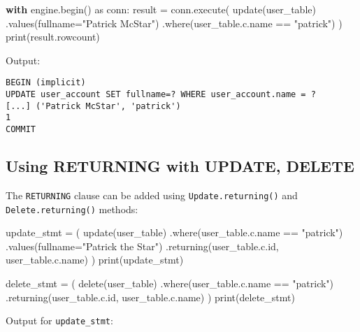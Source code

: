\documentclass[
  letterpaper,
  DIV=11,
  numbers=noendperiod]{scrreprt}
\newenvironment{Shaded}{\begin{snugshade}}{\end{snugshade}}
\newcommand{\BuiltInTok}[1]{\textcolor[rgb]{0.00,0.23,0.31}{#1}}
\newcommand{\ControlFlowTok}[1]{\textcolor[rgb]{0.00,0.23,0.31}{\textbf{#1}}}
\newcommand{\ImportTok}[1]{\textcolor[rgb]{0.00,0.46,0.62}{#1}}
\newcommand{\NormalTok}[1]{\textcolor[rgb]{0.00,0.23,0.31}{#1}}
\newcommand{\OperatorTok}[1]{\textcolor[rgb]{0.37,0.37,0.37}{#1}}
\newcommand{\StringTok}[1]{\textcolor[rgb]{0.13,0.47,0.30}{#1}}
\begin{document}
\begin{Shaded}
\begin{Highlighting}[]
\ControlFlowTok{with}\NormalTok{ engine.begin() }\ImportTok{as}\NormalTok{ conn:}
\NormalTok{    result }\OperatorTok{=}\NormalTok{ conn.execute(}
\NormalTok{        update(user\_table)}
\NormalTok{        .values(fullname}\OperatorTok{=}\StringTok{"Patrick McStar"}\NormalTok{)}
\NormalTok{        .where(user\_table.c.name }\OperatorTok{==} \StringTok{"patrick"}\NormalTok{)}
\NormalTok{    )}
    \BuiltInTok{print}\NormalTok{(result.rowcount)}
\end{Highlighting}
\end{Shaded}

Output:

\begin{verbatim}
BEGIN (implicit)
UPDATE user_account SET fullname=? WHERE user_account.name = ?
[...] ('Patrick McStar', 'patrick')
1
COMMIT
\end{verbatim}

\subsection{Using RETURNING with UPDATE,
DELETE}\label{using-returning-with-update-delete}

The \texttt{RETURNING} clause can be added using
\texttt{Update.returning()} and \texttt{Delete.returning()} methods:

\begin{Shaded}
\begin{Highlighting}[]
\NormalTok{update\_stmt }\OperatorTok{=}\NormalTok{ (}
\NormalTok{    update(user\_table)}
\NormalTok{    .where(user\_table.c.name }\OperatorTok{==} \StringTok{"patrick"}\NormalTok{)}
\NormalTok{    .values(fullname}\OperatorTok{=}\StringTok{"Patrick the Star"}\NormalTok{)}
\NormalTok{    .returning(user\_table.c.}\BuiltInTok{id}\NormalTok{, user\_table.c.name)}
\NormalTok{)}
\BuiltInTok{print}\NormalTok{(update\_stmt)}

\NormalTok{delete\_stmt }\OperatorTok{=}\NormalTok{ (}
\NormalTok{    delete(user\_table)}
\NormalTok{    .where(user\_table.c.name }\OperatorTok{==} \StringTok{"patrick"}\NormalTok{)}
\NormalTok{    .returning(user\_table.c.}\BuiltInTok{id}\NormalTok{, user\_table.c.name)}
\NormalTok{)}
\BuiltInTok{print}\NormalTok{(delete\_stmt)}
\end{Highlighting}
\end{Shaded}

Output for \texttt{update\_stmt}:
\end{document}
